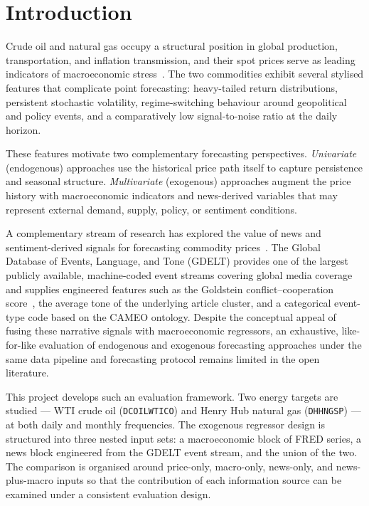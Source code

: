 \documentclass[12pt,a4paper]{article}
\begin{document}
\newpage
\tableofcontents
\newpage

\section{Introduction}\label{sec:intro}

Crude oil and natural gas occupy a structural position in global production, transportation, and inflation transmission, and their spot prices serve as leading indicators of macroeconomic stress~\citep{kilian2009not,hamilton2009causes,baumeister2016forty}. The two commodities exhibit several stylised features that complicate point forecasting: heavy-tailed return distributions, persistent stochastic volatility, regime-switching behaviour around geopolitical and policy events, and a comparatively low signal-to-noise ratio at the daily horizon.

These features motivate two complementary forecasting perspectives. \textit{Univariate} (endogenous) approaches use the historical price path itself to capture persistence and seasonal structure. \textit{Multivariate} (exogenous) approaches augment the price history with macroeconomic indicators and news-derived variables that may represent external demand, supply, policy, or sentiment conditions.

A complementary stream of research has explored the value of news and sentiment-derived signals for forecasting commodity prices~\citep{tetlock2007giving,shapiro2022measuring,baker2016measuring}. The Global Database of Events, Language, and Tone (GDELT) provides one of the largest publicly available, machine-coded event streams covering global media coverage~\citep{leetaru2013gdelt} and supplies engineered features such as the Goldstein conflict–cooperation score~\citep{goldstein1992conflict}, the average tone of the underlying article cluster, and a categorical event-type code based on the CAMEO ontology. Despite the conceptual appeal of fusing these narrative signals with macroeconomic regressors, an exhaustive, like-for-like evaluation of endogenous and exogenous forecasting approaches under the same data pipeline and forecasting protocol remains limited in the open literature.

This project develops such an evaluation framework. Two energy targets are studied — WTI crude oil (\texttt{DCOILWTICO}) and Henry Hub natural gas (\texttt{DHHNGSP}) — at both daily and monthly frequencies. The exogenous regressor design is structured into three nested input sets: a macroeconomic block of FRED series, a news block engineered from the GDELT event stream, and the union of the two. The comparison is organised around price-only, macro-only, news-only, and news-plus-macro inputs so that the contribution of each information source can be examined under a consistent evaluation design.
\end{document}
